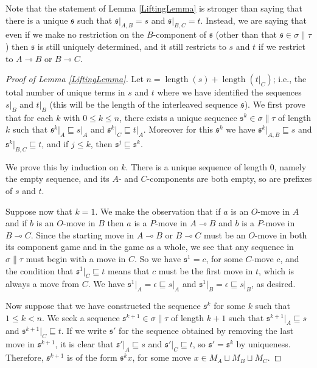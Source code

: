 \documentclass[11pt]{article} %
\theoremstyle{plain} %
\theoremstyle{definition} %
\theoremstyle{exercisestyle}
\renewcommand{\implies}{\multimap}
\newcommand{\cprd}{\sqcup}
\newcommand{\s}{\mathfrak s}
\newcommand{\emptyplay}{\epsilon}
\newcommand{\prefix}{\sqsubseteq}
\DeclareMathOperator{\length}{length}
\begin{document}
Note that the statement of Lemma \ref{LiftingLemma} is stronger than saying that there is a unique $\s$ such that $\s\vert_{A,B}=s$ and $\s\vert_{B,C}=t$.  Instead, we are saying that even if we make no restriction on the $B$-component of $\s$ (other than that $\s\in\sigma\|\tau$) then $\s$ is still uniquely determined, and it still restricts to $s$ and $t$ if we restrict to $A\implies B$ or $B\implies C$.

\begin{proof}[Proof of Lemma \ref{LiftingLemma}]
  Let $n=\length(s)+\length(t\vert_C)$; i.e., the total number of unique terms in $s$ and $t$ where we have identified the sequences $s\vert_B$ and $t\vert_B$ (this will be the length of the interleaved sequence $\s$).  We first prove that for each $k$ with $0\le k\le n$, there exists a unique sequence $\s^k\in\sigma\|\tau$ of length $k$ such that $\s^k\vert_A\prefix s\vert_A$ and $\s^k\vert_C\prefix t\vert_A$.  Moreover for this $\s^k$ we have $\s^k\vert_{A,B}\prefix s$ and $\s^k\vert_{B,C}\prefix t$, and if $j\le k$, then $\s^j\prefix\s^k$.

  We prove this by induction on $k$.  There is a unique sequence of length $0$, namely the empty sequence, and its $A$- and $C$-components are both empty, so are prefixes of $s$ and $t$.  

  Suppose now that $k=1$.  We make the observation that if $a$ is an $O$-move in $A$ and if $b$ is an $O$-move in $B$ then $a$ is a $P$-move in $A\implies B$ and $b$ is a $P$-move in $B\implies C$.  Since the starting move in $A\implies B$ or $B\implies C$ must be an $O$-move in both its component game and in the game as a whole, we see that any sequence in $\sigma\|\tau$ must begin with a move in $C$.  So we have $\s^1=c$, for some $C$-move $c$, and the condition that $\s^1\vert_C\prefix t$ means that $c$ must be the first move in $t$, which is always a move from $C$.  We have $\s^1\vert_A=\emptyplay\prefix s\vert_A$ and $\s^1\vert_B=\emptyplay\prefix s\vert_B$, as desired.

  Now suppose that we have constructed the sequence $\s^k$ for some $k$ such that $1\le k<n$.  We seek a sequence $\s^{k+1}\in \sigma\|\tau$ of length $k+1$ such that $\s^{k+1}\vert_A\prefix s$ and $\s^{k+1}\vert_C\prefix t$.  If we write $\s'$ for the sequence obtained by removing the last move in $\s^{k+1}$, it is clear that $\s'\vert_A\prefix s$ and $\s'\vert_C\prefix t$, so $\s'=\s^k$ by uniqueness.  Therefore, $\s^{k+1}$ is of the form $\s^kx$, for some move $x\in M_A\cprd M_B\cprd M_C$.  


\end{proof}
\end{document}
